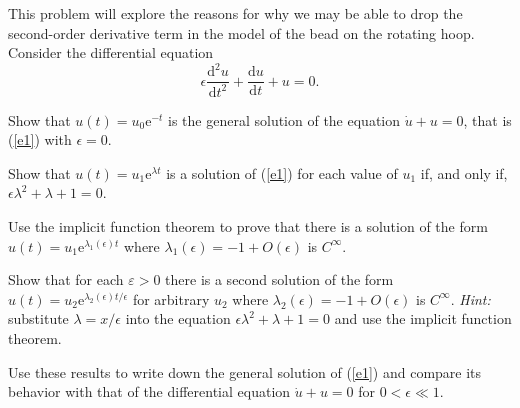 \documentclass[10pt]{article}
\newcommand{\rme}{\mathrm{e}}
\newcommand{\rmd}{\mathrm{d}}
\begin{document}
This problem will explore the reasons for why we may be able to drop the second-order derivative term in the model of the bead on the rotating hoop. Consider the differential equation
\begin{equation}\label{e1}
    \epsilon \frac{\rmd^2 u}{\rmd t^2} + \frac{\rmd u}{\rmd t} + u = 0.
\end{equation}
\begin{compactenum}[(i)]
    \item Show that $u(t)=u_0\rme^{-t}$ is the general solution of the equation $\dot{u}+u=0$, that is (\ref{e1}) with $\epsilon=0$.
    \item Show that $u(t)=u_1\rme^{\lambda t}$ is a solution of (\ref{e1}) for each value of $u_1$ if, and only if, $\epsilon\lambda^2+\lambda+1=0$.
    \item Use the implicit function theorem to prove that there is a solution of the form $u(t)=u_1 \rme^{\lambda_1(\epsilon)t}$ where $\lambda_1(\epsilon)=-1+O(\epsilon)$ is $C^\infty$.
    \item Show that for each $\varepsilon>0$ there is a second solution of the form $u(t)=u_2\rme^{\lambda_2(\epsilon)t/\epsilon}$ for arbitrary $u_2$ where $\lambda_2(\epsilon)=-1+O(\epsilon)$ is $C^\infty$. \emph{Hint:} substitute $\lambda=x/\epsilon$ into the equation $\epsilon\lambda^2+\lambda+1=0$ and use the implicit function theorem.
    \item Use these results to write down the general solution of (\ref{e1}) and compare its behavior with that of the differential equation $\dot{u}+u=0$ for $0<\epsilon\ll1$.
\end{compactenum}

\underline{\hspace*{\textwidth}}

\end{document}
